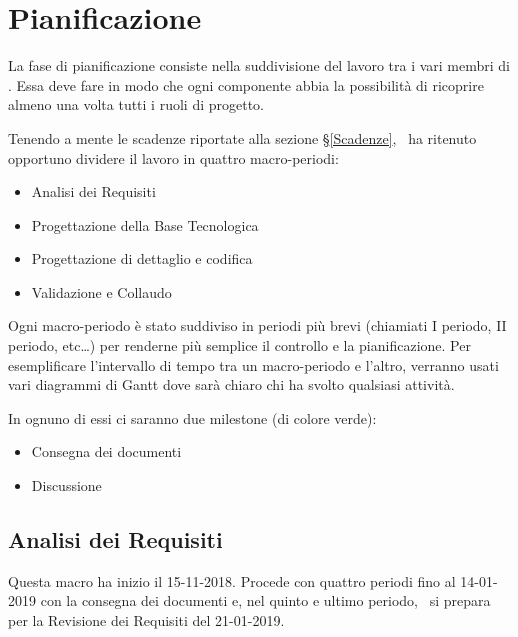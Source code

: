 \newpage
\section{Pianificazione}\label{Pianificazione}
	La fase di pianificazione consiste nella suddivisione del lavoro tra i vari membri di \gruppo.
	Essa deve fare in modo che ogni componente abbia la possibilità di ricoprire almeno una volta tutti i ruoli di progetto.
    
    Tenendo a mente le scadenze riportate alla sezione \S\ref{Scadenze}, \gruppo\ ha ritenuto opportuno dividere il lavoro in quattro macro-periodi:
	\begin{itemize}
	\item Analisi dei Requisiti
	\item Progettazione della Base Tecnologica
	\item Progettazione di dettaglio e codifica
	\item Validazione e Collaudo
	\end{itemize}

	Ogni macro-periodo è stato suddiviso in periodi più brevi (chiamiati I periodo, II periodo, etc\dots) per renderne più semplice il
    controllo e la pianificazione. Per esemplificare l'intervallo di tempo tra un macro-periodo e l'altro, verranno usati vari
    diagrammi di Gantt dove sarà chiaro chi ha svolto qualsiasi attività.

    In ognuno di essi ci saranno due milestone (di colore verde):

    \begin{itemize}
    	\item Consegna dei documenti
    	\item Discussione
    \end{itemize}

    \subsection{Analisi dei Requisiti}
        Questa macro ha inizio il 15-11-2018. Procede con quattro periodi fino al 14-01-2019 con la consegna dei documenti e, nel
        quinto e ultimo  periodo, \gruppo\ si prepara per la Revisione dei Requisiti del 21-01-2019.
        
